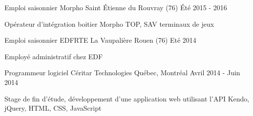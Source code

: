 

\begin{cventries}

  \cventry
	{Emploi saisonnier} %
	{Morpho} %
	{Saint Étienne du Rouvray (76)} %
	{Été 2015 - 2016} %
	{
		\begin{cvitems} %
			\item {Opérateur d'intégration boitier Morpho TOP, SAV terminaux de jeux }
		\end{cvitems}
	}

  \cventry
	{Emploi saisonnier} %
	{EDF{\enskip\cdotp\enskip}RTE } %
	{La Vaupalière {\enskip\cdotp\enskip} Rouen (76)} %
	{Eté 2014} %
	{
		\begin{cvitems} %
			\item {Employé administratif chez EDF}
		\end{cvitems}
	}

  \cventry
    {Programmeur logiciel} %
    {Céritar Technologies} %
    {Québec, Montréal} %
    {Avril 2014 - Juin 2014} %
    {
      \begin{cvitems} %
        \item {Stage de fin d'étude, développement d'une application web utilisant l'API Kendo, jQuery, HTML, CSS, JavaScript}
      \end{cvitems}
    }

\end{cventries}
